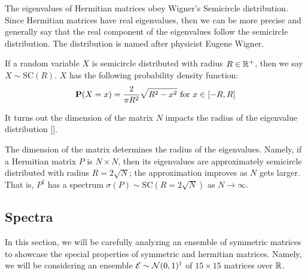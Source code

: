 The eigenvalues of Hermitian matrices obey Wigner's Semicircle distribution.
Since Hermitian matrices have real eigenvalues, then we can be more precise and generally say that the real component of the eigenvalues follow the semicircle distribution.
The distribution is named after physicist Eugene Wigner.

\begin{definition}
If a random variable $X$ is semicircle distributed with radius $R \in \mathbb{R}^+$, then we say $X \sim \text{SC}(R)$. $X$ has the following probability density function:
$$\textbf{P}(X = x) = \frac{2}{\pi R^2} \sqrt{R^2 - x^2} \text{ for } x \in [-R, R]$$
\end{definition}

It turns out the dimension of the matrix $N$ impacts the radius of the eigenvalue distribution [\cite{tao}].

\begin{remark}
The dimension of the matrix determines the radius of the eigenvalues.
Namely, if a Hermitian matrix $P$ is $N \times N$, then its eigenvalues are approximately semicircle distributed with radius $R = 2\sqrt{N}$; the approximation improves as $N$ gets larger.
That is, $P^{\dagger}$ has a spectrum $\sigma({P}) \sim \text{SC}(R = 2\sqrt{N})$ as $N \to \infty$.
\end{remark}



\newpage
\subsection{Spectra}

In this section, we will be carefully analyzing an ensemble of symmetric matrices to showcase
the special properties of symmetric and hermitian matrices.
Namely, we will be considering an ensemble $\mathcal{E} \sim \mathcal{N}(0,1)^\dagger$ of $15 \times 15$ matrices over $\mathbb{R}$.


